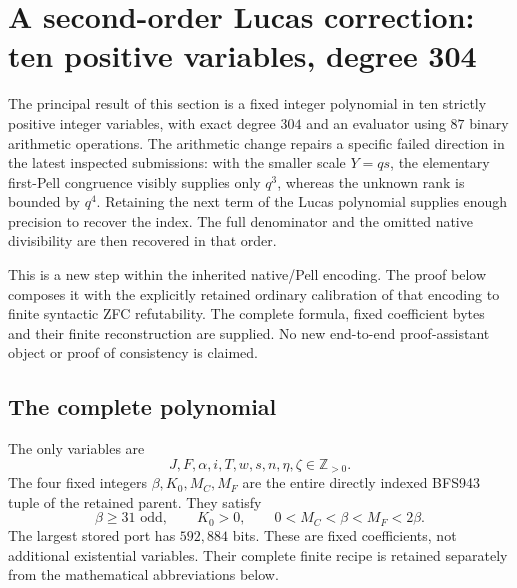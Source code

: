 \documentclass[11pt,letterpaper]{article}
\theoremstyle{definition}
\theoremstyle{remark}
\begin{document}
\section{A second-order Lucas correction: ten positive variables, degree 304}
\label{sec:lucas-q1}

The principal result of this section is a fixed integer polynomial in ten
strictly positive integer variables, with exact degree $304$ and an evaluator
using $87$ binary arithmetic operations.  The arithmetic change repairs a
specific failed direction in the latest inspected submissions: with the
smaller scale $Y=qs$, the elementary first-Pell congruence visibly supplies
only $q^3$, whereas the unknown rank is bounded by $q^4$.  Retaining the next
term of the Lucas polynomial supplies enough precision to recover the index.
The full denominator and the omitted native divisibility are then recovered
in that order.

This is a new step within the inherited native/Pell encoding.  The proof
below composes it with the explicitly retained ordinary calibration of that
encoding to finite syntactic ZFC refutability.  The complete formula, fixed
coefficient bytes and their finite reconstruction are supplied.  No new
end-to-end proof-assistant object or proof of consistency is claimed.

\subsection{The complete polynomial}

The only variables are
\[
 J,F,\alpha,i,T,w,s,n,\eta,\zeta\in\mathbb Z_{>0}.
\]
The four fixed integers $\beta,K_0,M_C,M_F$ are the entire directly indexed
BFS943 tuple of the retained parent.  They satisfy
\[
 \beta\ge31\text{ odd},\qquad K_0>0,\qquad
 0<M_C<\beta<M_F<2\beta.
\]
The largest stored port has $592{,}884$ bits.  These are fixed coefficients,
not additional existential variables.  Their complete finite recipe is
retained separately from the mathematical abbreviations below.
\end{document}
